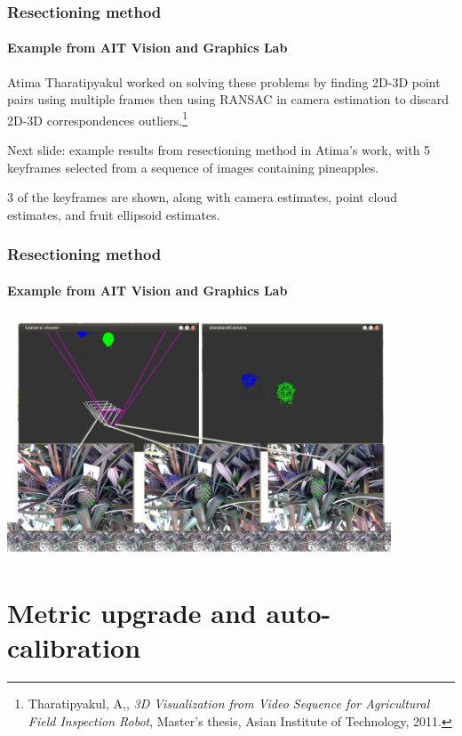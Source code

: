 \documentclass[aspectratio=169]{beamer}
\begin{document}
\begin{frame}
\frametitle{Resectioning method}
\framesubtitle{Example from AIT Vision and Graphics Lab}

Atima Tharatipyakul worked on solving these problems by finding 2D-3D
point pairs using multiple frames then using RANSAC in camera
estimation to discard 2D-3D correspondences
outliers.\footnote{Tharatipyakul, A,, \textit{3D Visualization from
    Video Sequence for Agricultural Field Inspection Robot}, Master's
  thesis, Asian Institute of Technology, 2011.}

\medskip

Next slide: example results from resectioning method in Atima's work,
with 5 keyframes selected from a sequence of images containing
pineapples.

\medskip

3 of the keyframes are shown, along with camera estimates, point cloud
estimates, and fruit ellipsoid estimates.

\end{frame}


\begin{frame}
\frametitle{Resectioning method}
\framesubtitle{Example from AIT Vision and Graphics Lab}

\centerline{\includegraphics[width=4.5in]{3Doutput.png}}

\end{frame}


\section{Metric upgrade and auto-calibration}
\end{document}
